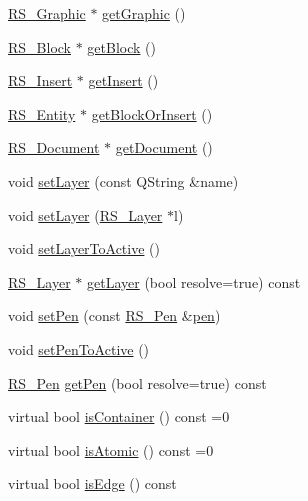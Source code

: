 \begin{DoxyCompactItemize}
\item 
\hyperlink{classRS__Graphic}{R\-S\-\_\-\-Graphic} $\ast$ \hyperlink{classRS__Entity_a45a4fda1d5b2a362b3d40462fd0b6ef6}{get\-Graphic} ()
\item 
\hyperlink{classRS__Block}{R\-S\-\_\-\-Block} $\ast$ \hyperlink{classRS__Entity_a1f90451881a07f6d74558ab79f492616}{get\-Block} ()
\item 
\hyperlink{classRS__Insert}{R\-S\-\_\-\-Insert} $\ast$ \hyperlink{classRS__Entity_a648d3e4b5b0ede32beba27cba106d6af}{get\-Insert} ()
\item 
\hyperlink{classRS__Entity}{R\-S\-\_\-\-Entity} $\ast$ \hyperlink{classRS__Entity_acecedbcfcfab1f128a148c3258a6fc96}{get\-Block\-Or\-Insert} ()
\item 
\hyperlink{classRS__Document}{R\-S\-\_\-\-Document} $\ast$ \hyperlink{classRS__Entity_af10ce811c490b56504d1b9392acba98b}{get\-Document} ()
\item 
void \hyperlink{classRS__Entity_ae485f2548e484a319dc531ebb4a88108}{set\-Layer} (const Q\-String \&name)
\item 
void \hyperlink{classRS__Entity_a206506fb090aee920ba9d13a0b69a902}{set\-Layer} (\hyperlink{classRS__Layer}{R\-S\-\_\-\-Layer} $\ast$l)
\item 
void \hyperlink{classRS__Entity_a3dc27731d7d66aeddb837b25bfb51e71}{set\-Layer\-To\-Active} ()
\item 
\hyperlink{classRS__Layer}{R\-S\-\_\-\-Layer} $\ast$ \hyperlink{classRS__Entity_a11f9355a9a9f7134c2ab6d618c94ab4f}{get\-Layer} (bool resolve=true) const 
\item 
void \hyperlink{classRS__Entity_a65fa57c0bc0d422d555315a1610af19a}{set\-Pen} (const \hyperlink{classRS__Pen}{R\-S\-\_\-\-Pen} \&\hyperlink{classRS__Entity_a9651a97a17dda8a5d2706e50fcf8c6f7}{pen})
\item 
void \hyperlink{classRS__Entity_af2a01a8dc3c6a2e3c23beb78e6c33dea}{set\-Pen\-To\-Active} ()
\item 
\hyperlink{classRS__Pen}{R\-S\-\_\-\-Pen} \hyperlink{classRS__Entity_a165330571469fce4f0b3ae42a923dbe6}{get\-Pen} (bool resolve=true) const 
\item 
virtual bool \hyperlink{classRS__Entity_a9e00b0b633e5146544498ad9a3e66add}{is\-Container} () const =0
\item 
virtual bool \hyperlink{classRS__Entity_a3918893713669c92ed54ba327d31bfef}{is\-Atomic} () const =0
\item 
virtual bool \hyperlink{classRS__Entity_aa71d0c049265021ac9b1e42ad20f3a74}{is\-Edge} () const 
\item 

\end{DoxyCompactItemize}
